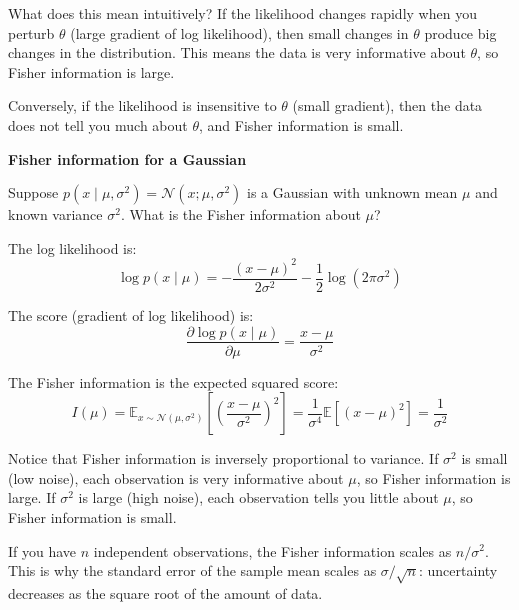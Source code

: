 \vspace{1em}

What does this mean intuitively? If the likelihood changes rapidly when you perturb $\theta$ (large gradient of log likelihood), then small changes in $\theta$ produce big changes in the distribution. This means the data is very informative about $\theta$, so Fisher information is large.

Conversely, if the likelihood is insensitive to $\theta$ (small gradient), then the data does not tell you much about $\theta$, and Fisher information is small.

\vspace{1.5em}

\begin{examplebox}
\textbf{Fisher information for a Gaussian}

\vspace{0.5em}

Suppose $p(x \mid \mu, \sigma^2) = \mathcal{N}(x; \mu, \sigma^2)$ is a Gaussian with unknown mean $\mu$ and known variance $\sigma^2$. What is the Fisher information about $\mu$?

\vspace{0.5em}

The log likelihood is:
\begin{equation*}
\log p(x \mid \mu) = -\frac{(x - \mu)^2}{2\sigma^2} - \frac{1}{2}\log(2\pi\sigma^2)
\end{equation*}

The score (gradient of log likelihood) is:
\begin{equation*}
\frac{\partial \log p(x \mid \mu)}{\partial \mu} = \frac{x - \mu}{\sigma^2}
\end{equation*}

The Fisher information is the expected squared score:
\begin{equation*}
I(\mu) = \mathbb{E}_{x \sim \mathcal{N}(\mu, \sigma^2)}\left[\left(\frac{x - \mu}{\sigma^2}\right)^2\right] = \frac{1}{\sigma^4}\mathbb{E}[(x - \mu)^2] = \frac{1}{\sigma^2}
\end{equation*}

\vspace{0.5em}

Notice that Fisher information is inversely proportional to variance. If $\sigma^2$ is small (low noise), each observation is very informative about $\mu$, so Fisher information is large. If $\sigma^2$ is large (high noise), each observation tells you little about $\mu$, so Fisher information is small.

\vspace{0.5em}

If you have $n$ independent observations, the Fisher information scales as $n / \sigma^2$. This is why the standard error of the sample mean scales as $\sigma / \sqrt{n}$: uncertainty decreases as the square root of the amount of data.
\end{examplebox}

